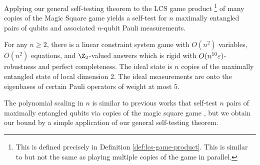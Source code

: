 Applying our general self-testing theorem to the LCS game product
\footnote{This is defined precisely in Definition \ref{def:lcs-game-product}. This is similar to but not the same as playing multiple copies of the game in parallel.} 
of many copies of the Magic Square game yields a self-test for $n$ maximally entangled pairs of qubits and associated $n$-qubit Pauli measurements. 

\begin{thm}\label{thm:informal-n-qudit-pauli-self-testing}
	For any $n\geq 2$, there is a linear constraint system game with $O(n^2)$ variables, $O(n^2)$ equations, and $\Z_2$-valued answers which is rigid with $O(n^{10}\varepsilon)$-robustness and perfect completeness.
	The ideal state is $n$ copies of the maximally entangled state of local dimension $2$. The ideal measurements are onto the eigenbases of certain Pauli operators of weight at most $5$. 
\end{thm}
The polynomial scaling in $n$ is similar to previous works that self-test $n$ pairs of maximally entangled qubits via copies of the magic square game \cite{coladan17, CN16}, but we obtain our bound by a simple application of our general self-testing theorem. 

